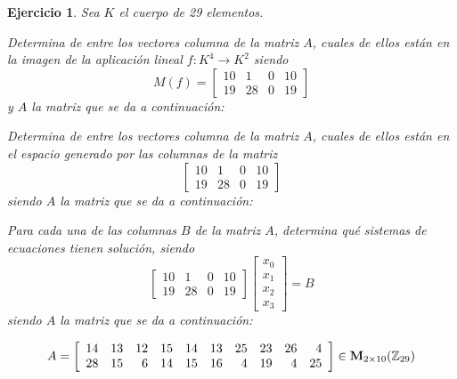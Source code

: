 \documentclass[12pt]{amsart}
\newtheorem{ejer}{Ejercicio}
\begin{document}
\begin{ejer} Sea $K$ el cuerpo de 29 elementos.
\newline
\noindent\begin{minipage}{\textwidth}
\begin{tcolorbox}[colback = green!20!white,title=Versión Núcleo]
Determina de entre los vectores columna de la matriz $A$, cuales de ellos están en la imagen de la aplicación lineal $f:K^{4} \to K^{2}$ siendo  $$ M(f) = \left[\begin{array}{rrrr}
10 & 1 & 0 & 10 \\
19 & 28 & 0 & 19
\end{array}\right] $$ y $A$ la matriz que se da a continuación:\end{tcolorbox}
\end{minipage} \newline
\noindent\begin{minipage}{\textwidth}
\begin{tcolorbox}[colback = blue!20!white,title=Versión Anulador]
Determina de entre los vectores columna de la matriz $A$, cuales de ellos están en el espacio generado por las columnas de la matriz $$ \left[\begin{array}{rrrr}
10 & 1 & 0 & 10 \\
19 & 28 & 0 & 19
\end{array}\right] $$ siendo $A$ la matriz que se da a continuación:\end{tcolorbox}
\end{minipage} \newline
\noindent\begin{minipage}{\textwidth} 
\begin{tcolorbox}[colback = red!20!white,title=Versión Ecuaciones Implícitas]
Para cada una de las columnas $B$ de la matriz $A$, determina qué sistemas de ecuaciones tienen solución, siendo $$ \left[\begin{array}{rrrr}
10 & 1 & 0 & 10 \\
19 & 28 & 0 & 19
\end{array}\right] \left[\begin{array}{r}
x_{0} \\
x_{1} \\
x_{2} \\
x_{3}
\end{array}\right] = B$$ siendo $A$ la matriz que se da a continuación:
\end{tcolorbox}
\end{minipage}
\[ A = \left[\begin{array}{rrrrrrrrrr}
14 & 13 & 12 & 15 & 14 & 13 & 25 & 23 & 26 & 4 \\
28 & 15 & 6 & 14 & 15 & 16 & 4 & 19 & 4 & 25
\end{array}\right] \in {\bf M}_{2\times 10}({\mathbb Z}_{29})\]
\end{ejer}
\end{document}
